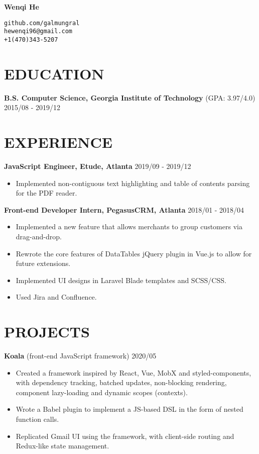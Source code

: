 \documentclass[12pt]{article}
\begin{document}
\parbox{0.25\textwidth}{\hfill}
\parbox{0.5\textwidth}{\centering\huge\bfseries Wenqi He}
\parbox{0.25\textwidth}{\texttt{github.com/galmungral\\hewenqi96@gmail.com\\+1(470)343-5207}}

\section*{EDUCATION}
\textbf{B.S. Computer Science, Georgia Institute of Technology} (GPA: 3.97/4.0) \hfill 2015/08 - 2019/12

\vspace{-0.5em}
\section*{EXPERIENCE}
\textbf{JavaScript Engineer, Etude, Atlanta} \hfill 2019/09 - 2019/12
\begin{itemize}
\item Implemented non-contiguous text highlighting and table of contents parsing for the PDF reader.
\end{itemize}

\textbf{Front-end Developer Intern, PegasusCRM, Atlanta} \hfill 2018/01 - 2018/04
\begin{itemize}
\item Implemented a new feature that allows merchants to group customers via drag-and-drop.
\item Rewrote the core features of DataTables jQuery plugin in Vue.js to allow for future extensions.
\item Implemented UI designs in Laravel Blade templates and SCSS/CSS. 
\item Used Jira and Confluence.
\end{itemize}

\section*{PROJECTS}

\textbf{Koala} (front-end JavaScript framework)  \hfill 2020/05
\begin{itemize}
\item Created a framework inspired by React, Vue, MobX and styled-components, with dependency tracking, batched updates, non-blocking rendering, component lazy-loading and dynamic scopes (contexts). 
\item Wrote a Babel plugin to implement a JS-based DSL in the form of nested function calls.
\item Replicated Gmail UI using the framework, with client-side routing and Redux-like state management.
\end{itemize}
\end{document}
